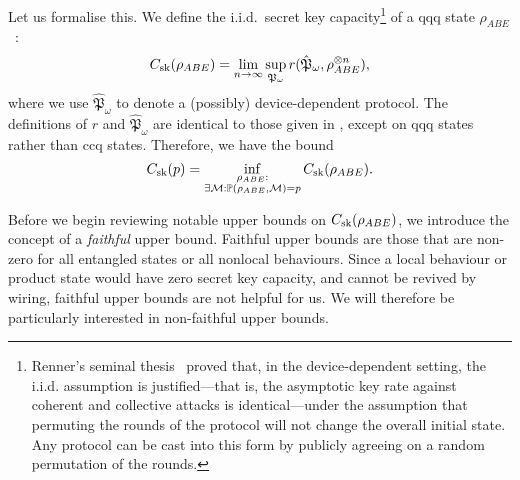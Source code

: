 \documentclass[10pt, a4paper]{article}
\numberwithin{equation}{section} %
\theoremstyle{definition}
\theoremstyle{plain}
\newcommand{\?}{\mathrel{?}} %
\newcommand{\sM}{\mathcal{M}}
\newcommand{\cP}{\mathbb{P}}
\newcommand{\sk}{\rm sk}
\begin{document}
      Let us formalise this. We define the i.i.d.\ secret key capacity\footnote{Renner's seminal thesis~\cite{RennerQKD} proved that, in the device-dependent setting, the i.i.d. assumption is justified---that is, the asymptotic key rate against coherent and collective attacks is identical---under the assumption that permuting the rounds of the protocol will not change the overall initial state. Any protocol can be cast into this form by publicly agreeing on a random permutation of the rounds.} of a qqq state \(\rho_{ABE}\)~\cite{CQKeyDistill}:
      \begin{equation}\label{eqn:seckeycapstate}
      C_{\sk}(\rho_{A B E}) = \lim_{n\to\infty} \sup_{\mathfrak{P}_{\omega}} r(\hat{\mathfrak{P}}_{\omega}, \rho_{ABE}^{\otimes n}),
      \end{equation}
      where we use \(\hat{\mathfrak{P}}_{\omega}\) to denote a (possibly) device-dependent protocol. The definitions of \(r\) and \(\hat{\mathfrak{P}}_{\omega}\) are identical to those given in , except on qqq states rather than ccq states. Therefore, we have the bound
    \begin{equation}
      C_{\sk}(p) = \inf_{ 
        \substack{\rho_{A B E} : \\ 
        \exists \sM : \cP(\rho_{A B E}, \sM) = p}
      } C_{\sk}(\rho_{A B E}).
    \end{equation}

      Before we begin reviewing notable upper bounds on \(C_{\sk}(\rho_{A B E})\), we introduce the concept of a \emph{faithful} upper bound. Faithful upper bounds are those that are non-zero for all entangled states or all nonlocal behaviours. Since a local behaviour or product state would have zero secret key capacity, and cannot be revived by wiring, faithful upper bounds are not helpful for us. We will therefore be particularly interested in non-faithful upper bounds.
\end{document}
